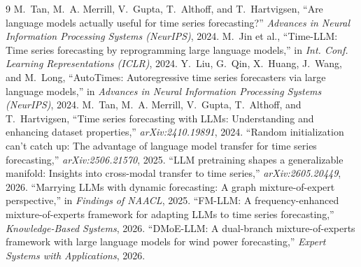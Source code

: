 \documentclass{article}
\begin{document}
\begin{thebibliography}{9}
 M.~Tan, M.~A. Merrill, V.~Gupta, T.~Althoff, and
T.~Hartvigsen, ``Are language models actually useful for time series
forecasting?'' \emph{Advances in Neural Information Processing Systems
(NeurIPS)}, 2024.
 M.~Jin et al., ``Time-LLM: Time series forecasting by
reprogramming large language models,'' in \emph{Int. Conf. Learning
Representations (ICLR)}, 2024.
 Y.~Liu, G.~Qin, X.~Huang, J.~Wang, and M.~Long,
``AutoTimes: Autoregressive time series forecasters via large language
models,'' in \emph{Advances in Neural Information Processing Systems
(NeurIPS)}, 2024.
 M.~Tan, M.~A. Merrill, V.~Gupta, T.~Althoff, and
T.~Hartvigsen, ``Time series forecasting with LLMs: Understanding and
enhancing dataset properties,'' \emph{arXiv:2410.19891}, 2024.
 ``Random initialization can't catch up: The advantage of
language model transfer for time series forecasting,'' \emph{arXiv:2506.21570},
2025.
 ``LLM pretraining shapes a generalizable manifold:
Insights into cross-modal transfer to time series,'' \emph{arXiv:2605.20449},
2026.
 ``Marrying LLMs with dynamic forecasting: A graph
mixture-of-expert perspective,'' in \emph{Findings of NAACL}, 2025.
 ``FM-LLM: A frequency-enhanced mixture-of-experts framework
for adapting LLMs to time series forecasting,'' \emph{Knowledge-Based Systems},
2026.
 ``DMoE-LLM: A dual-branch mixture-of-experts framework with
large language models for wind power forecasting,'' \emph{Expert Systems with
Applications}, 2026.
\end{thebibliography}
\end{document}

